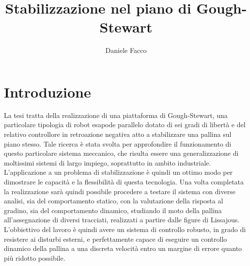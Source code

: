 \documentclass[12pt,twoside,openright]{report}
\title{Stabilizzazione nel piano di Gough-Stewart}
\author{Daniele Facco}
\date{}
\begin{document}
  \begin{frontespizio}
  \end{frontespizio}

\newpage
\hbox{}
\newpage
\tableofcontents
{}
\newpage



\chapter*{Introduzione}\label{intro}
La tesi tratta della realizzazione di una piattaforma di Gough-Stewart, una particolare tipologia di robot esapode parallelo dotato di sei gradi di libertà e del relativo controllore in retroazione negativa atto a stabilizzare una pallina sul piano stesso.
Tale ricerca è stata svolta per approfondire il funzionamento di questo particolare sistema meccanico, che risulta essere una generalizzazione di moltissimi sistemi di largo impiego, soprattutto in ambito industriale. L'applicazione a un problema di stabilizzazione è quindi un ottimo modo per dimostrare le capacità e la flessibilità di questa tecnologia. %
Una volta completata la realizzazione sarà quindi possibile procedere a testare il sistema con diverse analisi, sia del comportamento statico, con la valutazione della risposta al gradino, sia del comportamento dinamico, studiando il moto della pallina all'assegnazione di diversi tracciati, realizzati a partire dalle figure di Lissajous. L'obbiettivo del lavoro è quindi avere un sistema di controllo robusto, in grado di resistere ai disturbi esterni, e perfettamente capace di eseguire un controllo dinamico della pallina a una discreta velocità entro un margine di errore quanto più ridotto possibile.
\end{document}
